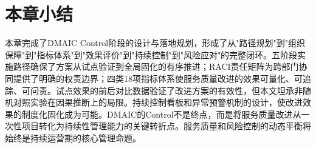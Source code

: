 \section{本章小结}

本章完成了DMAIC Control阶段的设计与落地规划，形成了从"路径规划"到"组织保障"到"指标体系"到"效果评价"到"持续控制"到"风险应对"的完整闭环。五阶段实施路径确保了方案从试点验证到全局固化的有序推进；RACI责任矩阵为跨部门协同提供了明确的权责边界；四类18项指标体系使服务质量改进的效果可量化、可追踪、可问责。试点效果的前后对比数据验证了改进方案的有效性，但本文坦承非随机对照实验在因果推断上的局限。持续控制看板和异常预警机制的设计，使改进效果的制度化固化成为可能。DMAIC的Control不是终点，而是将服务质量改进从一次性项目转化为持续性管理能力的关键转折点。服务质量和风险控制的动态平衡将始终是持续运营期的核心管理命题。

